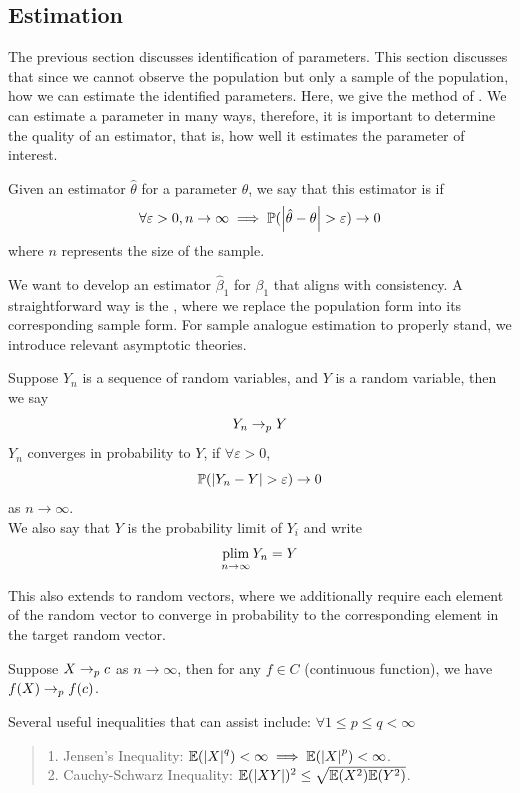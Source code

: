 \subsection{Estimation}
The previous section discusses identification of parameters. This section discusses that since we cannot observe the population but only a sample of the population, how we can estimate the identified parameters. Here, we give the method of . We can estimate a parameter in many ways, therefore, it is important to determine the quality of an estimator, that is, how well it estimates the parameter of interest.
\begin{definition}
    Given an estimator $\hat{\theta}$ for a parameter $\theta$, we say that this estimator is  if
    $$\forall \varepsilon > 0, n \to \infty \implies \mathbb{P}(\abs{\hat{\theta} - \theta} > \varepsilon) \to 0$$
    where $n$ represents the size of the sample.
\end{definition}
We want to develop an estimator $\hat{\beta}_1$ for $\beta_1$ that aligns with consistency. A straightforward way is the , where we replace the population form into its corresponding sample form. For sample analogue estimation to properly stand, we introduce relevant asymptotic theories.
\begin{definition}
    Suppose $Y_n$ is a sequence of random variables, and $Y$ is a random variable, then we say
    $$Y_n \to_p Y$$
    $Y_n$ converges in probability to $Y$, if $\forall \varepsilon > 0$,
    $$\mathbb{P}(\abs{Y_n - Y} > \varepsilon) \to 0$$ 
    as $n \to \infty$. \\
    We also say that $Y$ is the probability limit of $Y_i$ and write
    $$\operatorname*{plim}_{n \to \infty} Y_n = Y$$
\end{definition}
This also extends to random vectors, where we additionally require each element of the random vector to converge in probability to the corresponding element in the target random vector.
\begin{proposition}
    Suppose $X \to_p c$ as $n \to \infty$, then for any $f \in C$ (continuous function), we have $f(X) \to_p f(c)$.
\end{proposition}
\begin{lemma}
    Several useful inequalities that can assist include: $\forall 1 \le p \le q < \infty$
    \begin{quote}
        1. Jensen's Inequality: $\mathbb{E}(\abs{X}^q) < \infty \implies \mathbb{E}(\abs{X}^p) < \infty$. \\
        2. Cauchy-Schwarz Inequality: $\mathbb{E}(\abs{XY})^2 \le \sqrt{\mathbb{E}(X^2)\mathbb{E}(Y^2)}$.
    \end{quote}
\end{lemma}
